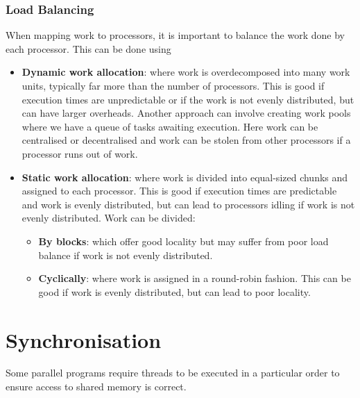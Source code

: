 \documentclass{article}
\begin{document}
\subsubsection{Load Balancing} When mapping work to processors, it is important to balance the work
done by each processor. This can be done using
\begin{itemize}
    \item \textbf{Dynamic work allocation}: where work is overdecomposed
          into many work units, typically far more than the number of
          processors. This is good if execution times are unpredictable
          or if the work is not evenly distributed, but can have
          larger overheads. Another approach can involve creating work
          pools where we have a queue of tasks awaiting execution. Here
          work can be centralised or decentralised and work can be
          stolen from other processors if a processor runs out of work.
    \item \textbf{Static work allocation}: where work is divided into
          equal-sized chunks and assigned to each processor. This is
          good if execution times are predictable and work is evenly
          distributed, but can lead to processors idling if work is not
          evenly distributed. Work can be divided:
          \begin{itemize}
              \item \textbf{By blocks}: which offer good locality
                    but may suffer from poor load balance if work is not
                    evenly distributed.
              \item \textbf{Cyclically}: where work is assigned in a
                    round-robin fashion. This can be good if work is evenly
                    distributed, but can lead to poor locality.
          \end{itemize}
\end{itemize}
\section{Synchronisation}
Some parallel programs require threads to be executed in a particular
order to ensure access to shared memory is correct.
\end{document}
